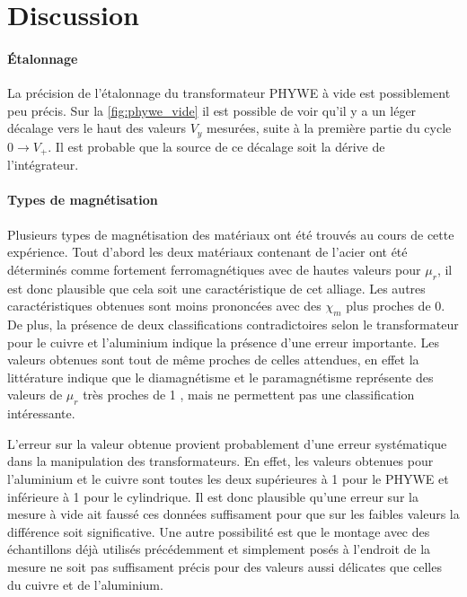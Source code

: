 \section{Discussion}

\paragraph*{Étalonnage}
La précision de l'étalonnage du transformateur PHYWE à vide est possiblement peu précis. Sur la \autoref{fig:phywe_vide} il est possible de voir qu'il y a un léger décalage vers le haut des valeurs \(V_y\) mesurées, suite à la première partie du cycle \(0 \rightarrow V_+\). Il est probable que la source de ce décalage soit la dérive de l'intégrateur.

\paragraph*{Types de magnétisation}
Plusieurs types de magnétisation des matériaux ont été trouvés au cours de cette expérience. Tout d'abord les deux matériaux contenant de l'acier ont été déterminés comme fortement ferromagnétiques avec de hautes valeurs pour \(\mu_r\), il est donc plausible que cela soit une caractéristique de cet alliage. Les autres caractéristiques obtenues sont moins prononcées avec des \(\chi_m\) plus proches de 0. De plus, la présence de deux classifications contradictoires selon le transformateur pour le cuivre et l'aluminium indique la présence d'une erreur importante. Les valeurs obtenues sont tout de même proches de celles attendues, en effet la littérature indique que le diamagnétisme et le paramagnétisme représente des valeurs de \(\mu_r\) très proches de 1 \cite{classification_litt}, mais ne permettent pas une classification intéressante.

L'erreur sur la valeur obtenue provient probablement d'une erreur systématique dans la manipulation des transformateurs. En effet, les valeurs obtenues pour l'aluminium et le cuivre sont toutes les deux supérieures à 1 pour le PHYWE et inférieure à 1 pour le cylindrique. Il est donc plausible qu'une erreur sur la mesure à vide ait faussé ces données suffisament pour que sur les faibles valeurs la différence soit significative. Une autre possibilité est que le montage avec des échantillons déjà utilisés précédemment et simplement posés à l'endroit de la mesure ne soit pas suffisament précis pour des valeurs aussi délicates que celles du cuivre et de l'aluminium.

